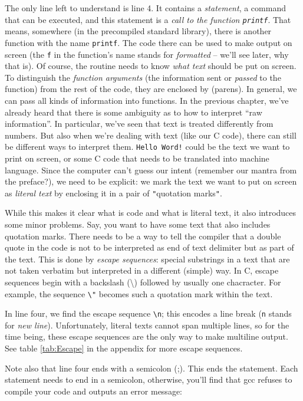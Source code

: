 The only line left to understand is line 4. It contains a \emph{statement}, \ie a command that can be executed, and this statement is a \emph{call to the function \texttt{printf}}. That means, somewhere (in the precompiled standard library), there is another function with the name \texttt{printf}. The code there can be used to make output on screen (the \texttt{f} in the function's name stands for \emph{formatted} -- we'll see later, why that is). Of course, the routine needs to know \emph{what text} should be put on screen. To distinguish the \emph{function arguments} (\ie the information sent or \emph{passed} to the function) from the rest of the code, they are enclosed by (parens). In general, we can pass all kinds of information into functions. In the previous chapter, we've already heard that there is some ambiguity as to how to interpret \enquote{raw information}. In particular, we've seen that text is treated differently from numbers. But also when we're dealing with text (like our C code), there can still be different ways to interpret them. \texttt{Hello Word!} could be the text we want to print on screen, or some C code that needs to be translated into machine language. Since the computer can't guess our intent (remember our mantra from the preface?), we need to be explicit: we mark the text we want to put on screen as \emph{literal text} by enclosing it in a pair of \texttt{"}quotation marks\texttt{"}.

While this makes it clear what is code and what is literal text, it also introduces some minor problems. Say, you want to have some text that also includes quotation marks. There needs to be a way to tell the compiler that a double quote in the code is not to be interpreted as end of text delimiter but as part of the text. This is done by \emph{escape sequences}: special substrings in a text that are not taken verbatim but interpreted in a different (simple) way. In C, escape sequences begin with a backslash (\textbackslash) followed by usually one chacracter. For example, the sequence \texttt{\textbackslash"} becomes such a quotation mark within the text.

In line four, we find the escape sequence \texttt{\textbackslash n}; this encodes a line break (\texttt{n} stands for \emph{new line}). Unfortunately, literal texts cannot span multiple lines, so for the time being, these escape sequences are the only way to make multiline output. See table \ref{tab:Escape} in the appendix for more escape sequences.

Note also that line four ends with a semicolon (;). This ends the statement. Each statement needs to end in a semicolon, otherwise, you'll find that gcc refuses to compile your code and outputs an error message:

